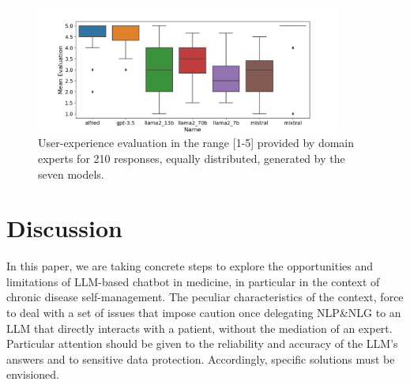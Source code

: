 \begin{figure}[t]
	\centering
	\includegraphics[width=0.9\textwidth]{figures/Figure_all.png}
	\caption{User-experience evaluation in the range [1-5] provided by domain experts for 210 responses, equally distributed, generated by the seven models.}
	\label{fig:eval-med}
\end{figure}








\section{Discussion}\label{sec:conc}

In this paper, we are taking concrete steps to explore the opportunities and limitations of LLM-based chatbot in medicine, 
in particular in the context of chronic disease self-management.
%
The peculiar characteristics of the context, force to deal with a set of issues that impose caution once delegating NLP\&NLG to an LLM that directly interacts with a patient, without the mediation of an expert. 
%
Particular attention should be given to the reliability and accuracy of the LLM's answers and to sensitive data protection.
%
Accordingly, specific solutions must be envisioned.

